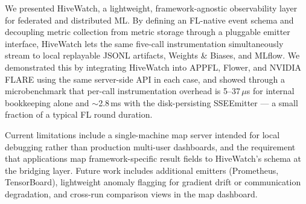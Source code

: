 We presented HiveWatch, a lightweight, framework-agnostic observability layer for federated and distributed ML. By defining an FL-native event schema and decoupling metric collection from metric storage through a pluggable emitter interface, HiveWatch lets the same five-call instrumentation simultaneously stream to local replayable JSONL artifacts, Weights \& Biases, and MLflow. We demonstrated this by integrating HiveWatch into APPFL, Flower, and NVIDIA FLARE using the same server-side API in each case, and showed through a microbenchmark that per-call instrumentation overhead is 5--37\,$\mu$s for internal bookkeeping alone and $\sim$2.8\,ms with the disk-persisting SSEEmitter — a small fraction of a typical FL round duration.

Current limitations include a single-machine map server intended for local debugging rather than production multi-user dashboards, and the requirement that applications map framework-specific result fields to HiveWatch's schema at the bridging layer. Future work includes additional emitters (Prometheus, TensorBoard), lightweight anomaly flagging for gradient drift or communication degradation, and cross-run comparison views in the map dashboard.
